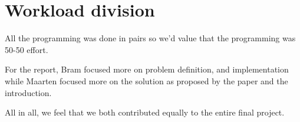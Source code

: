 \section{Workload division}
All the programming was done in pairs so we'd value that the programming was 50-50 effort.

For the report, Bram focused more on problem definition, and implementation while Maarten focused more on the solution as proposed by the paper and the introduction.

All in all, we feel that we both contributed equally to the entire final project.
